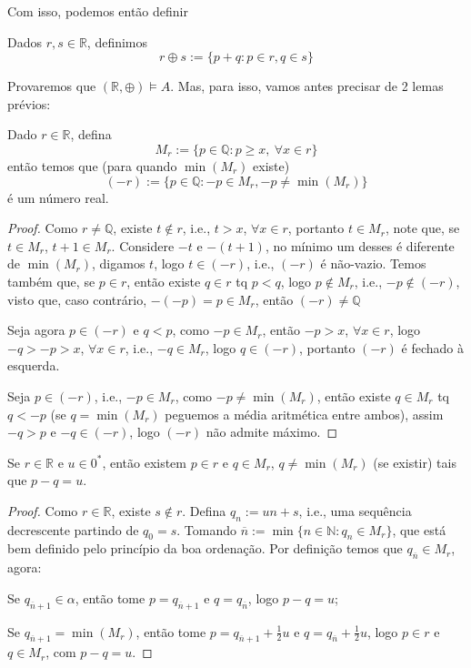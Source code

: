 \documentclass[11pt]{article}
\newcommand{\mbb}[1]{\mathbb{#1}}
\newcommand{\ol}[1]{\overline{#1}}
\newcommand{\cl}[1]{\colorlet{shadecolor}{#1}}
\begin{document}
Com isso, podemos então definir

\begin{shaded}
\begin{theorem}
    Dados $r,s\in\mbb{R}$, definimos
    $$r\oplus s:=\{p+q:p\in r,q\in s\}$$
\end{theorem}
\end{shaded}

Provaremos que $(\mbb{R},\oplus)\vDash A$. Mas, para isso, vamos antes precisar de 2 lemas prévios:

\cl{purple!15}
\begin{shaded}
\begin{lemma}
    Dado $r\in\mbb{R}$, defina
    $$M_r:=\{p\in\mbb{Q}:p\geq x,~\forall x\in r\}$$
    então temos que (para quando $\min(M_r)$ existe)
    $$(-r):=\{p\in\mbb{Q}:-p\in M_r, -p\neq\min(M_r)\}$$
    é um número real.
\end{lemma}
\end{shaded}

\begin{proof}
    Como $r\neq\mbb{Q}$, existe $t\notin r$, i.e., $t>x$, $\forall x\in r$, portanto $t\in M_r$, note que, se $t\in M_r$, $t+1\in M_r$. Considere $-t$ e $-(t+1)$, no mínimo um desses é diferente de $\min(M_r)$, digamos $t$, logo $t\in(-r)$, i.e., $(-r)$ é não-vazio. Temos também que, se $p\in r$, então existe $q\in r$ tq $p< q$, logo $p\notin M_r$, i.e., $-p\notin (-r)$, visto que, caso contrário, $-(-p)=p\in M_r$, então $(-r)\neq\mbb{Q}$

    Seja agora $p\in(-r)$ e $q< p$, como $-p\in M_r$, então $-p> x$, $\forall x\in r$, logo $-q>-p> x$, $\forall x\in r$, i.e., $-q\in M_r$, logo $q\in (-r)$, portanto $(-r)$ é fechado à esquerda.

    Seja $p\in (-r)$, i.e., $-p\in M_r$, como $-p\neq\min(M_r)$, então existe $q\in M_r$ tq $q<-p$ (se $q=\min(M_r)$ peguemos a média aritmética entre ambos), assim $-q> p$ e $-q\in(-r)$, logo $(-r)$ não admite máximo.
\end{proof}

\begin{shaded}
\begin{lemma}
    Se $r\in\mbb{R}$ e $u\in0^*$, então existem $p\in r$ e $q\in M_r$, $q\neq\min(M_r)$ (se existir) tais que $p-q=u$.
\end{lemma}
\end{shaded}

\begin{proof}
    Como $r\in\mbb{R}$, existe $s\notin r$. Defina $q_n:=un+s$, i.e., uma sequência decrescente partindo de $q_0=s$. Tomando $\ol{n}:=\min\{n\in\mbb{N}:q_n\in M_r\}$, que está bem definido pelo princípio da boa ordenação. Por definição temos que $q_{\ol{n}}\in M_r$, agora:

    Se $q_{\ol{n}+1}\in\alpha$, então tome $p=q_{\ol{n}+1}$ e $q=q_{\ol{n}}$, logo $p-q=u$;

    Se $q_{\ol{n}+1}=\min(M_r)$, então tome $p=q_{\ol{n}+1}+\frac12u$ e $q=q_{\ol{n}}+\frac12u$, logo $p\in r$ e $q\in M_r$, com $p-q=u$.
\end{proof}
\end{document}
